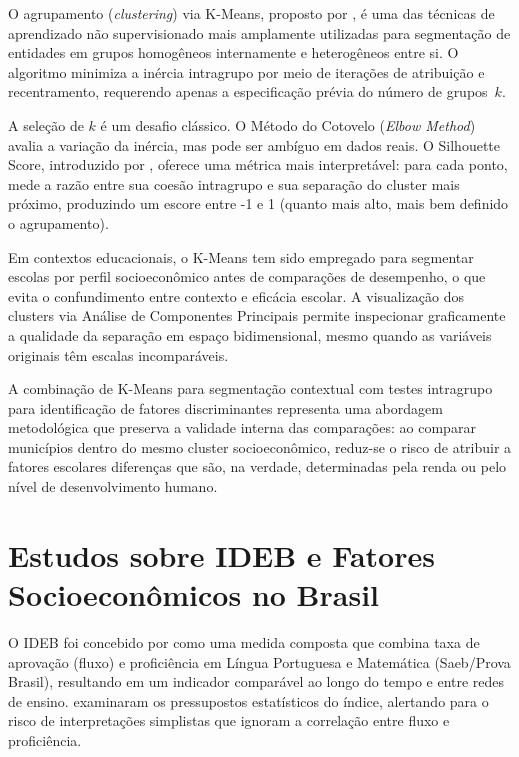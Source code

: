 O agrupamento (\textit{clustering}) via K-Means, proposto por \citet{macqueen1967}, é uma das técnicas de aprendizado não supervisionado mais amplamente utilizadas para segmentação de entidades em grupos homogêneos internamente e heterogêneos entre si. O algoritmo minimiza a inércia intragrupo por meio de iterações de atribuição e recentramento, requerendo apenas a especificação prévia do número de grupos~$k$.

A seleção de $k$ é um desafio clássico. O Método do Cotovelo (\textit{Elbow Method}) avalia a variação da inércia, mas pode ser ambíguo em dados reais. O Silhouette Score, introduzido por \citet{rousseeuw1987}, oferece uma métrica mais interpretável: para cada ponto, mede a razão entre sua coesão intragrupo e sua separação do cluster mais próximo, produzindo um escore entre -1 e 1 (quanto mais alto, mais bem definido o agrupamento).

Em contextos educacionais, o K-Means tem sido empregado para segmentar escolas por perfil socioeconômico antes de comparações de desempenho, o que evita o confundimento entre contexto e eficácia escolar. A visualização dos clusters via Análise de Componentes Principais \cite{abdi2010} permite inspecionar graficamente a qualidade da separação em espaço bidimensional, mesmo quando as variáveis originais têm escalas incomparáveis.

A combinação de K-Means para segmentação contextual com testes intragrupo para identificação de fatores discriminantes representa uma abordagem metodológica que preserva a validade interna das comparações: ao comparar municípios dentro do mesmo cluster socioeconômico, reduz-se o risco de atribuir a fatores escolares diferenças que são, na verdade, determinadas pela renda ou pelo nível de desenvolvimento humano.

\section{Estudos sobre IDEB e Fatores Socioeconômicos no Brasil}

O IDEB foi concebido por \citet{fernandes2007} como uma medida composta que combina taxa de aprovação (fluxo) e proficiência em Língua Portuguesa e Matemática (Saeb/Prova Brasil), resultando em um indicador comparável ao longo do tempo e entre redes de ensino. \citet{soares2013} examinaram os pressupostos estatísticos do índice, alertando para o risco de interpretações simplistas que ignoram a correlação entre fluxo e proficiência.

